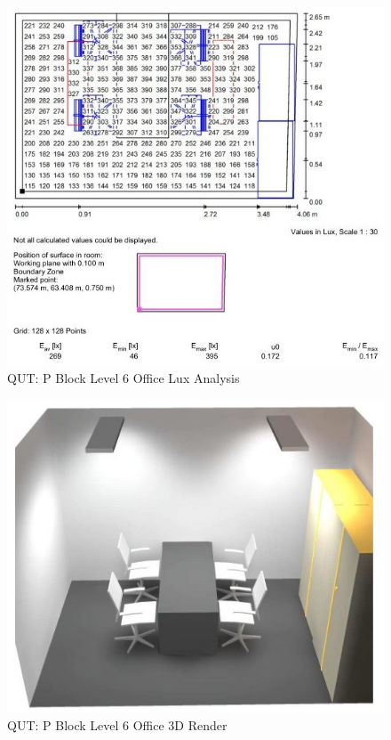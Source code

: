 \begin{figure}[H]
	\hfill\includegraphics[width = 150mm]{images/project-model/dialux-office-workplane-summary}\hspace*{\fill}
	\caption{QUT: P Block Level 6 Office Lux Analysis} 
	\label{fig:dialux-office-workplane-summary}
\end{figure}

\begin{figure}[H]
	\hfill\includegraphics[width = 150mm]{images/project-model/dialux-office-3D}\hspace*{\fill}
	\caption{QUT: P Block Level 6 Office 3D Render} 
	\label{fig:dialux-office-3D}
\end{figure}

